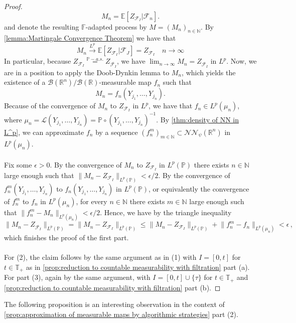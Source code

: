 \documentclass[11pt,a4paper,twoside,openany]{report}
\theoremstyle{plain} %
\theoremstyle{definition} %
\theoremstyle{remark} %
\begin{document}
\begin{proof}
\begin{equation}
    M_n=\mathbb{E}[Z_{\mathcal{F}_I}|\mathcal{F}_n].
\end{equation}
and denote the resulting \(\mathbb{F}\)-adapted process by \(M=(M_n)_{n\in\mathbb{N}}\). By \cref{lemma:Martingale Convergence Theorem} we have that 
\begin{equation}
    M_n\overset{L^p}{\to}\mathbb{E}[Z_{\mathcal{F}_I}|\mathcal{F}_J]=Z_{\mathcal{F}_I}\quad n\to\infty
\end{equation}
In particular, because \(Z_{\mathcal{F}_I}\overset{\mathbb{P}-a.s.}{=}Z_{\overline{\mathcal{F}_I}}\), we have \(\lim_{n\to\infty}M_n=Z_{\overline{\mathcal{F}_I}}\) in \(L^p\). Now, we are in a position to apply the Doob-Dynkin lemma to \(M_n\), which yields the existence of a \(\mathcal{B}(\mathbb{R}^n)/\mathcal{B}(\mathbb{R})\)-measurable map \(f_n\) such that 
\begin{equation}
    M_n = f_n(Y_{j_1},\dots,Y_{j_n}).
\end{equation}
Because of the convergence of \(M_n\) to \(Z_{\mathcal{F}_I}\) in \(L^p\), we have that \(f_n\in L^p(\mu_n)\), where \(\mu_n=\mathcal{L}(Y_{j_1},\dots,Y_{j_n})=\mathbb{P}\circ(Y_{j_1},\dots,Y_{j_n})^{-1}\). By \cref{thm:density of NN in L^p}, we can approximate \(f_n\) by a sequence \((f_n^m)_{m\in\mathbb{N}}\subset \mathcal{NN}_\psi({\mathbb{R}^n})\) in \(L^p(\mu_n)\). \\\\
Fix some \(\epsilon>0\). By the convergence of \(M_n\) to \(Z_{\mathcal{F}_I}\) in \(L^p(\mathbb{P})\) there exists \(n\in\mathbb{N}\) large enough such that \(\lVert M_n-Z_{\mathcal{F}_I}\rVert_{L^p(\mathbb{P})}<\epsilon/2\). By the convergence of \(f_n^m(Y_{j_1},\dots,Y_{j_n})\) to \(f_n(Y_{j_1},\dots,Y_{j_n})\) in \(L^p(\mathbb{P})\), or equivalently the convergence of \(f_n^m\) to \(f_n\) in \(L^p(\mu_n)\), for every \(n\in\mathbb{N}\) there exists \(m\in\mathbb{N}\) large enough such that \(\lVert f_n^m-M_n\rVert_{L^p(\mu_n)}<\epsilon/2\). Hence, we have by the triangle inequality
\begin{equation}
    \lVert M_n-Z_{\overline{\mathcal{F}_I}}\rVert_{L^p(\mathbb{P})}=\lVert M_n-Z_{\mathcal{F}_I}\rVert_{L^p(\mathbb{P})}\leq \lVert M_n-Z_{\mathcal{F}_I}\rVert_{L^p(\mathbb{P})}+\lVert f_n^m-f_n\rVert_{L^p(\mu_n)}<\epsilon\,,
\end{equation}
which finishes the proof of the first part. \\\\
For (2), the claim follows by the same argument as in (1) with \(I=[0,t]\) for \(t\in\mathbb{T}_+\) as in \cref{prop:reduction to countable measurability with filtration} part (a). For part (3), again by the same argument, with \(I=[0,t]\cup\{\tau\}\) for \(t\in\mathbb{T}_+\) and \cref{prop:reduction to countable measurability with filtration} part (b). 
\end{proof}
The following proposition is an interesting observation in the context of \cref{prop:approximation of measurable maps by algorithmic strategies} part (2). 
\end{document}
